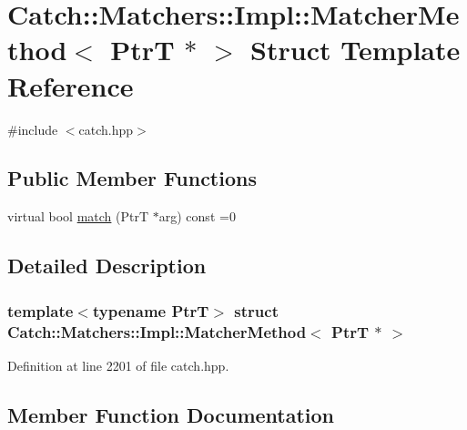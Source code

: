 \hypertarget{struct_catch_1_1_matchers_1_1_impl_1_1_matcher_method_3_01_ptr_t_01_5_01_4}{}\section{Catch\+:\+:Matchers\+:\+:Impl\+:\+:Matcher\+Method$<$ PtrT $\ast$ $>$ Struct Template Reference}
\label{struct_catch_1_1_matchers_1_1_impl_1_1_matcher_method_3_01_ptr_t_01_5_01_4}


{\ttfamily \#include $<$catch.\+hpp$>$}

\subsection*{Public Member Functions}
\begin{DoxyCompactItemize}
\item 
virtual bool \mbox{\hyperlink{struct_catch_1_1_matchers_1_1_impl_1_1_matcher_method_3_01_ptr_t_01_5_01_4_a5fdd64f9509724f32ffc73cb320181d1}{match}} (PtrT $\ast$arg) const =0
\end{DoxyCompactItemize}


\subsection{Detailed Description}
\subsubsection*{template$<$typename PtrT$>$\newline
struct Catch\+::\+Matchers\+::\+Impl\+::\+Matcher\+Method$<$ Ptr\+T $\ast$ $>$}



Definition at line 2201 of file catch.\+hpp.



\subsection{Member Function Documentation}
\mbox{\label{struct_catch_1_1_matchers_1_1_impl_1_1_matcher_method_3_01_ptr_t_01_5_01_4_a5fdd64f9509724f32ffc73cb320181d1}} 
